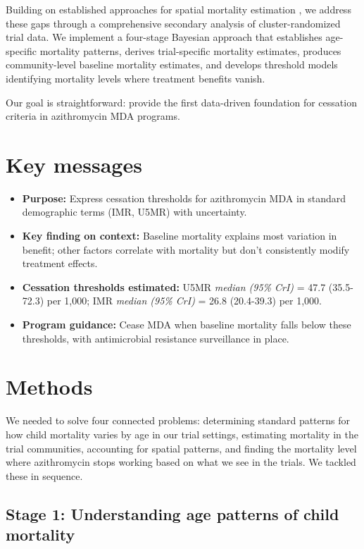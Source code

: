 \documentclass[11pt]{article}\usepackage[]{graphicx}\usepackage[]{xcolor}
\begin{document}
Building on established approaches for spatial mortality estimation \citep{besag1991bym, wakefield2020insr}, we address these gaps through a comprehensive secondary analysis of cluster-randomized trial data. We implement a four-stage Bayesian approach that establishes age-specific mortality patterns, derives trial-specific mortality estimates, produces community-level baseline mortality estimates, and develops threshold models identifying mortality levels where treatment benefits vanish.

Our goal is straightforward: provide the first data-driven foundation for cessation criteria in azithromycin MDA programs.

\section*{Key messages}



\begin{itemize}[leftmargin=1.1em]
\item \textbf{Purpose:} Express cessation thresholds for azithromycin MDA in standard demographic terms (IMR, U5MR) with uncertainty.
\item \textbf{Key finding on context:} Baseline mortality explains most variation in benefit; other factors correlate with mortality but don't consistently modify treatment effects.
\item \textbf{Cessation thresholds estimated:} U5MR \emph{median (95\% CrI)} = 47.7 (35.5-72.3) per 1,000; IMR \emph{median (95\% CrI)} = 26.8 (20.4-39.3) per 1,000.
\item \textbf{Program guidance:} Cease MDA when baseline mortality falls below these thresholds, with antimicrobial resistance surveillance in place.
\end{itemize}

\clearpage

\section{Methods}

We needed to solve four connected problems: determining standard patterns for how child mortality varies by age in our trial settings, estimating mortality in the trial communities, accounting for spatial patterns, and finding the mortality level where azithromycin stops working based on what we see in the trials. We tackled these in sequence.

\subsection{Stage 1: Understanding age patterns of child mortality}
\end{document}
